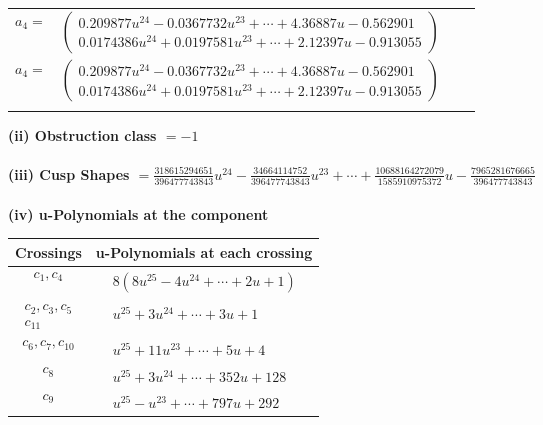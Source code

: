 \documentclass[1p]{elsarticle_modified}
\theoremstyle{definition}
\begin{document}
\begin{tabular}{m{7pt} m{180pt} m{7pt} m{180pt} }
\flushright $a_{4}=$&$\begin{pmatrix}0.209877 u^{24}-0.0367732 u^{23}+\cdots+4.36887 u-0.562901\\0.0174386 u^{24}+0.0197581 u^{23}+\cdots+2.12397 u-0.913055\end{pmatrix}$\\ \flushright $a_{4}=$&$\begin{pmatrix}0.209877 u^{24}-0.0367732 u^{23}+\cdots+4.36887 u-0.562901\\0.0174386 u^{24}+0.0197581 u^{23}+\cdots+2.12397 u-0.913055\end{pmatrix}$\\&\end{tabular}
\flushleft \textbf{(ii) Obstruction class $= -1$}\\~\\
\flushleft \textbf{(iii) Cusp Shapes $= \frac{318615294651}{396477743843} u^{24}-\frac{34664114752}{396477743843} u^{23}+\cdots+\frac{10688164272079}{1585910975372} u-\frac{7965281676665}{396477743843}$}\\~\\
\newpage\renewcommand{\arraystretch}{1}
\flushleft \textbf{(iv) u-Polynomials at the component}\newline \\
\begin{tabular}{m{50pt}|m{274pt}}
Crossings & \hspace{64pt}u-Polynomials at each crossing \\
\hline $$\begin{aligned}c_{1},c_{4}\end{aligned}$$&$\begin{aligned}
&8(8 u^{25}-4 u^{24}+\cdots+2 u+1)
\end{aligned}$\\
\hline $$\begin{aligned}c_{2},c_{3},c_{5}\\c_{11}\end{aligned}$$&$\begin{aligned}
&u^{25}+3 u^{24}+\cdots+3 u+1
\end{aligned}$\\
\hline $$\begin{aligned}c_{6},c_{7},c_{10}\end{aligned}$$&$\begin{aligned}
&u^{25}+11 u^{23}+\cdots+5 u+4
\end{aligned}$\\
\hline $$\begin{aligned}c_{8}\end{aligned}$$&$\begin{aligned}
&u^{25}+3 u^{24}+\cdots+352 u+128
\end{aligned}$\\
\hline $$\begin{aligned}c_{9}\end{aligned}$$&$\begin{aligned}
&u^{25}- u^{23}+\cdots+797 u+292
\end{aligned}$\\
\hline
\end{tabular}\\~\\
\end{document}
